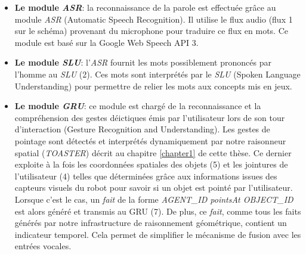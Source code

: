 \documentclass[a4paper,11pt,twoside]{StyleThese}
\begin{document}
\begin{itemize}
\item \textbf{Le module \textit{ASR}}: la reconnaissance de la parole est effectuée grâce au module \textit{ASR} (Automatic Speech Recognition). Il utilise le flux audio (flux 1 sur le schéma) provenant du microphone pour traduire ce flux en mots. Ce module est basé sur la Google Web Speech API 3.

\item \textbf{Le module \textit{SLU}}: l'\textit{ASR} fournit les mots possiblement prononcés par l'homme au \textit{SLU} (2). Ces mots sont interprétés par le \textit{SLU} (Spoken Language Understanding) pour permettre de relier les mots aux concepts mis en jeux.

\item \textbf{Le module \textit{GRU}}: ce module est chargé de la reconnaissance et la compréhension des gestes déictiques émis par l’utilisateur lors de son tour d’interaction (Gesture Recognition and Understanding). Les gestes de pointage sont détectés et interprétés dynamiquement par notre raisonneur spatial (\textit{TOASTER}) décrit au chapitre \ref{chapter1} de cette thèse. Ce dernier exploite à la fois les coordonnées spatiales des objets (5) et les jointures de l’utilisateur (4) telles que déterminées grâce aux informations issues des capteurs visuels du robot pour savoir si un objet est pointé par l’utilisateur. Lorsque c’est le cas, un \textit{fait} de la forme \textit{AGENT\_ID pointsAt
OBJECT\_ID} est alors généré et transmis au GRU (7). De plus, ce \textit{fait}, comme tous les faits générés par notre infrastructure de raisonnement géométrique, contient un indicateur temporel. Cela permet de simplifier le mécanisme de
fusion avec les entrées vocales.


\end{itemize}
\end{document}
